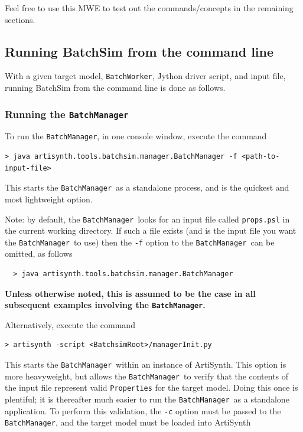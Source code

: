 \documentclass{article}
\newcommand{\BM}{{\tt BatchManager}}
\newcommand{\BW}{{\tt BatchWorker}}
\begin{document}
Feel free to use this MWE to test out the commands/concepts in the remaining sections.

\subsection{Running BatchSim from the command line}
\label{running:CLI}

With a given target model, \BW, Jython driver script, and input file, running BatchSim from the command line is done as follows.

\subsubsection{Running the \BM}
\label{running:CLI:BM}

To run the \BM, in one console window, execute the command

\begin{lstlisting}[]
  > java artisynth.tools.batchsim.manager.BatchManager -f <path-to-input-file>
\end{lstlisting}

This starts the \BM\ as a standalone process, and is the quickest and most lightweight option.

\begin{sideblock}
Note: by default, the \BM\ looks for an input file called {\tt props.psl} in the current working directory. If such a file exists (and is the input file you want the \BM\ to use) then the {\tt -f} option to the \BM\ can be omitted, as follows
\begin{verbatim}
  > java artisynth.tools.batchsim.manager.BatchManager
\end{verbatim}
\textbf{Unless otherwise noted, this is assumed to be the case in all subsequent examples involving the \BM.}
\end{sideblock}

Alternatively, execute the command

\begin{lstlisting}[]
  > artisynth -script <BatchsimRoot>/managerInit.py
\end{lstlisting}

This starts the \BM\ within an instance of ArtiSynth. This option is more heavyweight, but allows the \BM\ to verify that the contents of the input file represent valid {\tt Properties} for the target model. Doing this once is plentiful; it is thereafter much easier to run the \BM\ as a standalone application. To perform this validation, the {\tt -c} option must be passed to the \BM, and the target model must be loaded into ArtiSynth
\end{document}
